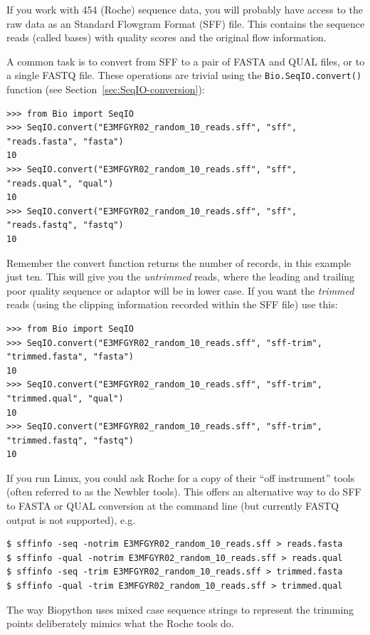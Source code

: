 \documentclass{report}
\begin{document}
If you work with 454 (Roche) sequence data, you will probably have access
to the raw data as an Standard Flowgram Format (SFF) file. This contains
the sequence reads (called bases) with quality scores and the original
flow information.

A common task is to convert from SFF to a pair of FASTA and QUAL files,
or to a single FASTQ file. These operations are trivial using the
\verb|Bio.SeqIO.convert()| function (see Section~\ref{sec:SeqIO-conversion}):

\begin{verbatim}
>>> from Bio import SeqIO
>>> SeqIO.convert("E3MFGYR02_random_10_reads.sff", "sff", "reads.fasta", "fasta")
10
>>> SeqIO.convert("E3MFGYR02_random_10_reads.sff", "sff", "reads.qual", "qual")
10
>>> SeqIO.convert("E3MFGYR02_random_10_reads.sff", "sff", "reads.fastq", "fastq")
10
\end{verbatim}

\noindent Remember the convert function returns the number of records, in
this example just ten. This will give you the \emph{untrimmed} reads, where
the leading and trailing poor quality sequence or adaptor will be in lower
case. If you want the \emph{trimmed} reads (using the clipping information
recorded within the SFF file) use this:

\begin{verbatim}
>>> from Bio import SeqIO
>>> SeqIO.convert("E3MFGYR02_random_10_reads.sff", "sff-trim", "trimmed.fasta", "fasta")
10
>>> SeqIO.convert("E3MFGYR02_random_10_reads.sff", "sff-trim", "trimmed.qual", "qual")
10
>>> SeqIO.convert("E3MFGYR02_random_10_reads.sff", "sff-trim", "trimmed.fastq", "fastq")
10
\end{verbatim}

If you run Linux, you could ask Roche for a copy of their ``off instrument''
tools (often referred to as the Newbler tools). This offers an alternative way to
do SFF to FASTA or QUAL conversion at the command line (but currently FASTQ output
is not supported), e.g.

\begin{verbatim}
$ sffinfo -seq -notrim E3MFGYR02_random_10_reads.sff > reads.fasta
$ sffinfo -qual -notrim E3MFGYR02_random_10_reads.sff > reads.qual
$ sffinfo -seq -trim E3MFGYR02_random_10_reads.sff > trimmed.fasta
$ sffinfo -qual -trim E3MFGYR02_random_10_reads.sff > trimmed.qual
\end{verbatim}

\noindent The way Biopython uses mixed case sequence strings to represent
the trimming points deliberately mimics what the Roche tools do.
\end{document}
